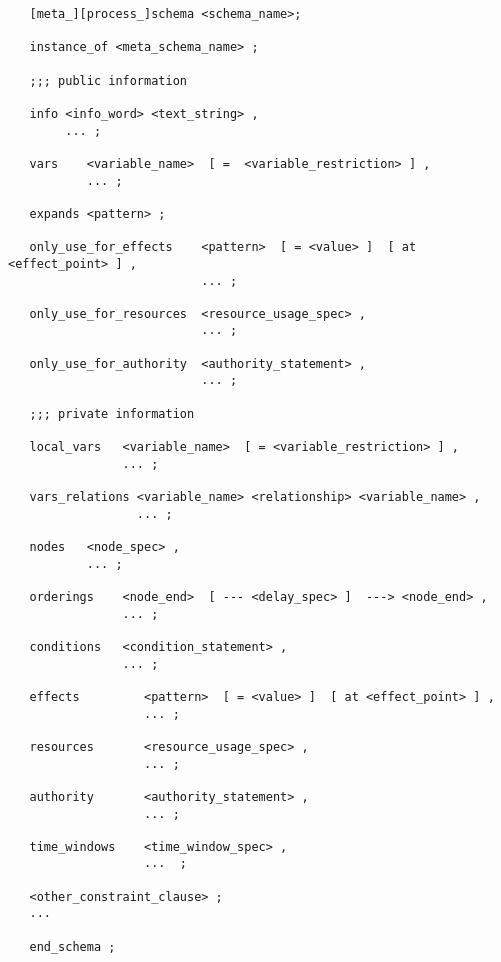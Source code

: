 \begin{verbatim}
   [meta_][process_]schema <schema_name>;

   instance_of <meta_schema_name> ;

   ;;; public information

   info <info_word> <text_string> ,
        ... ;

   vars    <variable_name>  [ =  <variable_restriction> ] ,
           ... ;

   expands <pattern> ;

   only_use_for_effects    <pattern>  [ = <value> ]  [ at <effect_point> ] ,
                           ... ;

   only_use_for_resources  <resource_usage_spec> ,
                           ... ;

   only_use_for_authority  <authority_statement> ,
                           ... ;

   ;;; private information

   local_vars   <variable_name>  [ = <variable_restriction> ] ,
                ... ;

   vars_relations <variable_name> <relationship> <variable_name> ,
                  ... ;

   nodes   <node_spec> ,
           ... ;

   orderings    <node_end>  [ --- <delay_spec> ]  ---> <node_end> ,
                ... ;

   conditions   <condition_statement> ,
                ... ;

   effects         <pattern>  [ = <value> ]  [ at <effect_point> ] ,
                   ... ;

   resources       <resource_usage_spec> ,
                   ... ;

   authority       <authority_statement> ,
                   ... ;

   time_windows    <time_window_spec> ,
                   ...  ;

   <other_constraint_clause> ;
   ...

   end_schema ;
\end{verbatim}
\index{{\bf --$ $}}
\index{{\bf ---$>$}}

